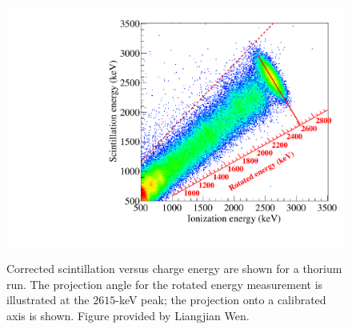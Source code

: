 \begin{figure}
\begin{center}
\includegraphics[keepaspectratio=true,width=\textwidth]{RotationTh2D_withCalibration.pdf}
\end{center}
\renewcommand{\baselinestretch}{1}
\small\normalsize
\begin{quote}
\caption{Corrected scintillation versus charge energy are shown for a thorium run.  The projection angle for the rotated energy measurement is illustrated at the $2615$-keV peak; the projection onto a calibrated axis is shown.  Figure provided by Liangjian Wen.}
\label{fig:LiangjianAnticorrelatedEnergy}
\end{quote}
\end{figure}
\renewcommand{\baselinestretch}{2}
\small\normalsize

